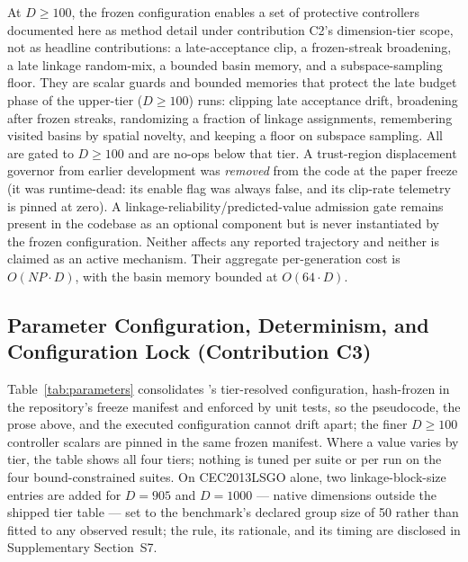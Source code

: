 At $D\ge100$, the frozen configuration enables a set of protective
controllers documented here as method detail under contribution C2's
dimension-tier scope, not as headline contributions: a late-acceptance
clip, a frozen-streak broadening, a late linkage random-mix, a bounded
basin memory, and a subspace-sampling floor. %
They are scalar guards and bounded memories that protect the late
budget phase of the upper-tier ($D{\ge}100$) runs: clipping late acceptance
drift, broadening after frozen streaks, randomizing a fraction of
linkage assignments, remembering visited basins by spatial novelty, and
keeping a floor on subspace sampling. All are gated to
$D\ge100$ and are no-ops below that tier.
A trust-region displacement governor from earlier development was
\emph{removed} from the code at the paper freeze (it was runtime-dead: its
enable flag was always false, and its clip-rate telemetry is pinned at zero).
A linkage-reliability/predicted-value admission gate remains present in the
codebase as an optional component but is never instantiated by the frozen
configuration. Neither affects any reported trajectory and neither is claimed
as an active mechanism.
Their aggregate per-generation cost is $O(NP\cdot D)$, with the basin
memory bounded at $O(64\cdot D)$. %

\subsection{Parameter Configuration, Determinism, and Configuration Lock (Contribution C3)}\label{sec:alg:profile}

Table~\ref{tab:parameters} consolidates \dtgsk{}'s tier-resolved
configuration, hash-frozen in the repository's freeze manifest and
enforced by unit tests, so the pseudocode, the prose above, and the
executed configuration cannot drift apart; the finer $D\ge100$
controller scalars are pinned in the same frozen manifest.
Where a value varies by tier, the table shows all four tiers; nothing
is tuned per suite or per run on the four bound-constrained suites. On
CEC2013LSGO alone, two linkage-block-size entries are added for
$D = 905$ and $D = 1000$ --- native dimensions outside the shipped tier
table --- set to the benchmark's declared group size of 50 rather than
fitted to any observed result; the rule, its rationale, and its timing
are disclosed in Supplementary Section~S7.

